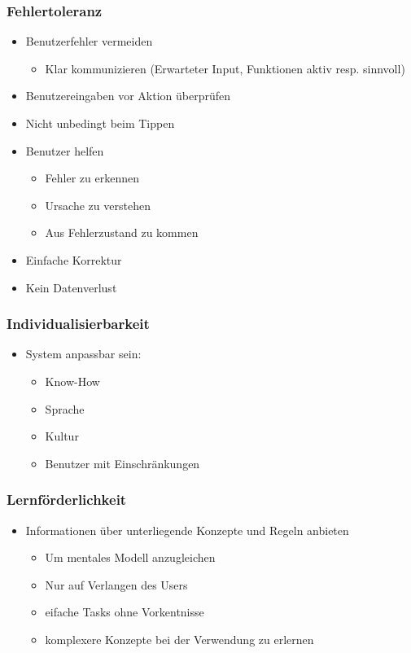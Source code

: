 \documentclass[../ZF_SWEN1.tex]{subfiles}
\begin{document}
\subsubsection{Fehlertoleranz}
\begin{itemize}
	\item Benutzerfehler vermeiden
	\begin{itemize}
		\item Klar kommunizieren (Erwarteter Input, Funktionen aktiv resp. sinnvoll)
	\end{itemize}
	\item Benutzereingaben vor Aktion überprüfen
	\item Nicht unbedingt beim Tippen
	\item Benutzer helfen
	\begin{itemize}
		\item Fehler zu erkennen
		\item Ursache zu verstehen
		\item Aus Fehlerzustand zu kommen
	\end{itemize}
	\item Einfache Korrektur
	\item Kein Datenverlust
\end{itemize}

\subsubsection{Individualisierbarkeit}
\begin{itemize}
	\item System anpassbar sein:
	\begin{itemize}
		\item Know-How
		\item Sprache
		\item Kultur
		\item Benutzer mit Einschränkungen
	\end{itemize}	
\end{itemize}

\subsubsection{Lernförderlichkeit}
\begin{itemize}
	\item Informationen über unterliegende Konzepte und Regeln anbieten
	\begin{itemize}
		\item Um mentales Modell anzugleichen
		\item Nur auf Verlangen des Users
		\item eifache Tasks ohne Vorkentnisse
		\item komplexere Konzepte bei der Verwendung zu erlernen
	\end{itemize}
\end{itemize}
\end{document}
